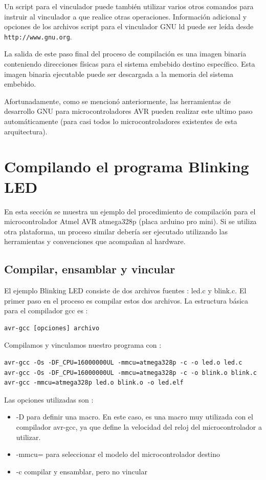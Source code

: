 \documentclass[output=paper, 
colorlinks,
citecolor=brown,
newtxmath
]{langscibook}
\begin{document}
Un script para el vinculador puede también utilizar varios otros comandos
para instruir al vinculador a que realice otras operaciones.
Información adicional y opciones de los archivos script para el vinculador GNU ld
puede ser leída desde \texttt{http://www.gnu.org}.

La salida de este paso final del proceso de compilación es una imagen binaria
conteniendo direcciones físicas para el sistema embebido destino específico.
Esta imagen binaria ejecutable puede ser descargada a la memoria del sistema embebido.

Afortunadamente, como se mencionó anteriormente, las herramientas de desarrollo
GNU para microcontroladores AVR pueden realizar este ultimo paso automáticamente
(para casi todos lo microcontroladores existentes de esta arquitectura).

\section {Compilando el programa Blinking LED}

En esta sección se muestra un ejemplo del procedimiento de compilación 
para el microcontrolador Atmel AVR atmega328p (placa arduino pro mini).
Si se utiliza otra plataforma, un proceso similar debería ser ejecutado
utilizando las herramientas y convenciones que acompañan al hardware.

\subsection {Compilar, ensamblar y vincular}

El ejemplo Blinking LED consiste de dos archivos fuentes : led.c y blink.c.
El primer paso en el proceso es compilar estos dos archivos.
La estructura básica para el compilador gcc es :

\begin{verbatim}
avr-gcc [opciones] archivo
\end{verbatim}

Compilamos y vinculamos nuestro programa con :

\begin{verbatim}
avr-gcc -Os -DF_CPU=16000000UL -mmcu=atmega328p -c -o led.o led.c
avr-gcc -Os -DF_CPU=16000000UL -mmcu=atmega328p -c -o blink.o blink.c
avr-gcc -mmcu=atmega328p led.o blink.o -o led.elf
\end{verbatim}

Las opciones utilizadas son :

\begin{itemize}
\item -D para definir una macro. En este caso, es una macro muy utilizada
con el compilador avr-gcc, ya que define la velocidad del reloj del microcontrolador
a utilizar.
\item -mmcu= para seleccionar el modelo del microcontrolador destino 
\item -c compilar y ensamblar, pero no vincular
\end{itemize}
\end{document}
